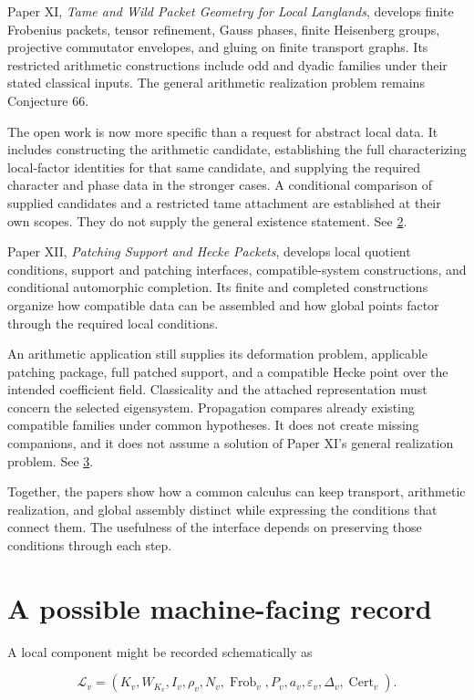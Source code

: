 \documentclass[11pt,oneside,openany]{book}
\begin{document}
Paper XI, \emph{Tame and Wild Packet Geometry for Local Langlands}, develops finite Frobenius packets, tensor refinement, Gauss phases, finite Heisenberg groups, projective commutator envelopes, and gluing on finite transport graphs. Its restricted arithmetic constructions include odd and dyadic families under their stated classical inputs. The general arithmetic realization problem remains Conjecture 66.

The open work is now more specific than a request for abstract local data. It includes constructing the arithmetic candidate, establishing the full characterizing local-factor identities for that same candidate, and supplying the required character and phase data in the stronger cases. A conditional comparison of supplied candidates and a restricted tame attachment are established at their own scopes. They do not supply the general existence statement. See \hyperlink{reference-2}{2}.

Paper XII, \emph{Patching Support and Hecke Packets}, develops local quotient conditions, support and patching interfaces, compatible-system constructions, and conditional automorphic completion. Its finite and completed constructions organize how compatible data can be assembled and how global points factor through the required local conditions.

An arithmetic application still supplies its deformation problem, applicable patching package, full patched support, and a compatible Hecke point over the intended coefficient field. Classicality and the attached representation must concern the selected eigensystem. Propagation compares already existing compatible families under common hypotheses. It does not create missing companions, and it does not assume a solution of Paper XI's general realization problem. See \hyperlink{reference-3}{3}.

Together, the papers show how a common calculus can keep transport, arithmetic realization, and global assembly distinct while expressing the conditions that connect them. The usefulness of the interface depends on preserving those conditions through each step.

\section{A possible machine-facing record}
A local component might be recorded schematically as

\[
\mathcal L_v=
(K_v,W_{K_v},I_v,\rho_v,N_v,\operatorname{Frob}_v,
P_v,a_v,\varepsilon_v,\Delta_v,\operatorname{Cert}_v).
\]
\end{document}
